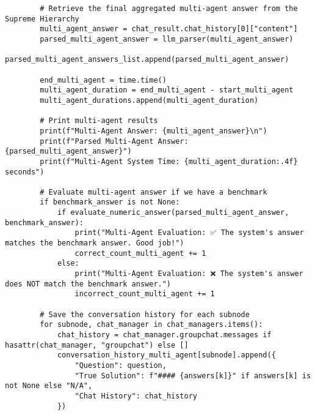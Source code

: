 \begin{lstlisting}
        # Retrieve the final aggregated multi-agent answer from the Supreme Hierarchy
        multi_agent_answer = chat_result.chat_history[0]["content"]
        parsed_multi_agent_answer = llm_parser(multi_agent_answer)
        parsed_multi_agent_answers_list.append(parsed_multi_agent_answer)

        end_multi_agent = time.time()
        multi_agent_duration = end_multi_agent - start_multi_agent
        multi_agent_durations.append(multi_agent_duration)

        # Print multi-agent results
        print(f"Multi-Agent Answer: {multi_agent_answer}\n")
        print(f"Parsed Multi-Agent Answer: {parsed_multi_agent_answer}")
        print(f"Multi-Agent System Time: {multi_agent_duration:.4f} seconds")

        # Evaluate multi-agent answer if we have a benchmark
        if benchmark_answer is not None:
            if evaluate_numeric_answer(parsed_multi_agent_answer, benchmark_answer):
                print("Multi-Agent Evaluation: ✅ The system's answer matches the benchmark answer. Good job!")
                correct_count_multi_agent += 1
            else:
                print("Multi-Agent Evaluation: ❌ The system's answer does NOT match the benchmark answer.")
                incorrect_count_multi_agent += 1

        # Save the conversation history for each subnode
        for subnode, chat_manager in chat_managers.items():
            chat_history = chat_manager.groupchat.messages if hasattr(chat_manager, "groupchat") else []
            conversation_history_multi_agent[subnode].append({
                "Question": question,
                "True Solution": f"#### {answers[k]}" if answers[k] is not None else "N/A",
                "Chat History": chat_history
            })


\end{lstlisting}
